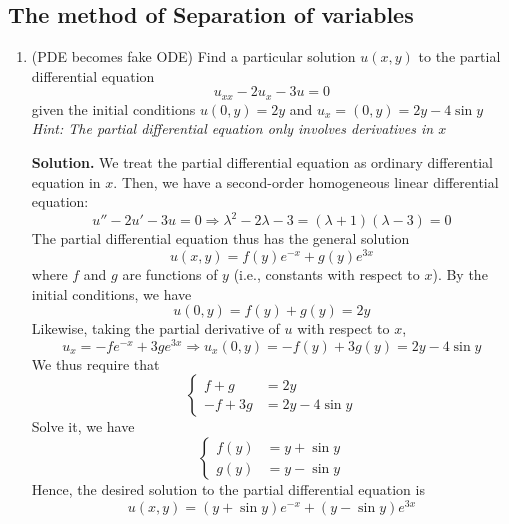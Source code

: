 \documentclass{article}
\begin{document}
\subsection{The method of Separation of variables}
\begin{enumerate}
    \item (PDE becomes fake ODE) Find a particular solution $u(x,y)$ to the partial differential equation
    \begin{equation*}
        u_{xx}-2u_x-3u=0
    \end{equation*}
    given the initial conditions $u(0,y)=2y$ and $u_x=(0,y)=2y-4\sin y$ \textit{Hint: The partial differential equation only involves derivatives in $x$}
    
    \textbf{Solution.}  We treat the partial differential equation as ordinary differential equation in $x$. Then, we have a second-order homogeneous linear differential equation:
    \begin{equation*}
        u''-2u'-3u=0\Rightarrow \lambda^2-2\lambda-3=(\lambda+1)(\lambda-3)=0
    \end{equation*}
    The partial differential equation thus has the general solution
    \begin{equation*}
        u(x,y)=f(y)e^{-x}+g(y)e^{3x}
    \end{equation*}
    where $f$ and $g$ are functions of $y$ (i.e., constants with respect to $x$). By the initial conditions, we have
    \begin{equation*}
        u(0,y)=f(y)+g(y)=2y
    \end{equation*}
    Likewise, taking the partial derivative of $u$ with respect to $x$,
    \begin{equation*}
        u_x=-fe^{-x}+3ge^{3x}\Rightarrow u_x(0,y)=-f(y)+3g(y)=2y-4\sin y
    \end{equation*}
    We thus require that
    \begin{equation*}
        \begin{cases}
            f+g&=2y\\
            -f+3g&=2y-4\sin y
        \end{cases}
    \end{equation*}
    Solve it, we have
    \begin{equation*}
        \begin{cases}
            f(y)&=y+\sin y \\
            g(y)&=y-\sin y
        \end{cases}
    \end{equation*}
    Hence, the desired solution to the partial differential equation is
    \begin{equation*}
        u(x,y)=(y+\sin y)e^{-x}+(y-\sin y)e^{3x}
    \end{equation*}
\end{enumerate}
\end{document}
